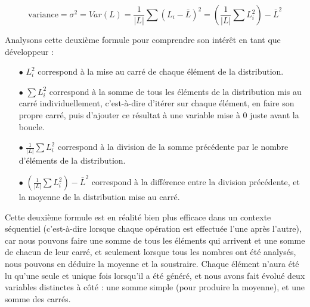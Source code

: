\documentclass[11pt,a4paper]{article}
\begin{document}
\begin{center}
\begin{equation*}
\text{variance} = \sigma^{2} = Var(L) = \frac{1}{|L|} \sum (L_{i} - \bar{L})^{2} = \left( \frac{1}{|L|} \sum L_{i}^{2} \right) - \bar{L}^{2}
\end{equation*}
\end{center}

\bigskip

Analysons cette deuxième formule pour comprendre son intérêt en tant que développeur :

\medskip

\begin{itemize}
\item[$\bullet$] $ L_{i}^{2} $ correspond à la mise au carré de chaque élément de la distribution.

\item[$\bullet$] $ \sum L_{i}^{2} $ correspond à la somme de tous les éléments de la distribution mis au carré individuellement, c'est-à-dire d'itérer sur chaque élément, en faire son propre carré, puis d'ajouter ce résultat à une variable mise à $ 0 $ juste avant la boucle.

\item[$\bullet$] $ \frac{1}{|L|} \sum L_{i}^{2} $ correspond à la division de la somme précédente par le nombre d'éléments de la distribution.

\item[$\bullet$] $ ( \frac{1}{|L|} \sum L_{i}^{2} ) - \bar{L}^{2} $ correspond à la différence entre la division précédente, et la moyenne de la distribution mise au carré.
\end{itemize}

Cette deuxième formule est en réalité bien plus efficace dans un contexte séquentiel (c'est-à-dire lorsque chaque opération est effectuée l'une après l'autre), car nous pouvons faire une somme de tous les éléments qui arrivent et une somme de chacun de leur carré, et seulement lorsque tous les nombres ont été analysés, nous pouvons en déduire la moyenne et la soustraire.
Chaque élément n'aura été lu qu'une seule et unique fois lorsqu'il a été généré, et nous avons fait évolué deux variables distinctes à côté : une somme simple (pour produire la moyenne), et une somme des carrés.

%
%
\end{document}
